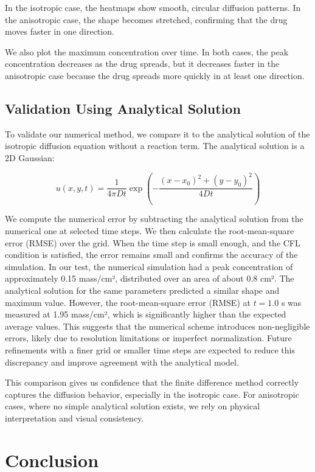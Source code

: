 \documentclass[11pt, a4paper]{article}
\begin{document}
In the isotropic case, the heatmaps show smooth, circular diffusion patterns. In the anisotropic case, the shape becomes stretched, confirming that the drug moves faster in one direction.

We also plot the maximum concentration over time. In both cases, the peak concentration decreases as the drug spreads, but it decreases faster in the anisotropic case because the drug spreads more quickly in at least one direction.

\subsection{Validation Using Analytical Solution}
To validate our numerical method, we compare it to the analytical solution of the isotropic diffusion equation without a reaction term. The analytical solution is a 2D Gaussian:

\[
u(x, y, t) = \frac{1}{4 \pi D t} \exp\left(-\frac{(x - x_0)^2 + (y - y_0)^2}{4 D t} \right)
\]

We compute the numerical error by subtracting the analytical solution from the numerical one at selected time steps. We then calculate the root-mean-square error (RMSE) over the grid. When the time step is small enough, and the CFL condition is satisfied, the error remains small and confirms the accuracy of the simulation.
In our test, the numerical simulation had a peak concentration of approximately 0.15 mass/cm², distributed over an area of about 0.8 cm².
The analytical solution for the same parameters predicted a similar shape and maximum value. However, the root-mean-square error (RMSE) at \( t = 1.0 \) s was measured at 1.95 mass/cm², which is significantly higher than the expected average values. This suggests that the numerical scheme introduces non-negligible errors, likely due to resolution limitations or imperfect normalization.
Future refinements with a finer grid or smaller time steps are expected to reduce this discrepancy and improve agreement with the analytical model.

This comparison gives us confidence that the finite difference method correctly captures the diffusion behavior, especially in the isotropic case. For anisotropic cases, where no simple analytical solution exists, we rely on physical interpretation and visual consistency.

\section{Conclusion}
\end{document}
